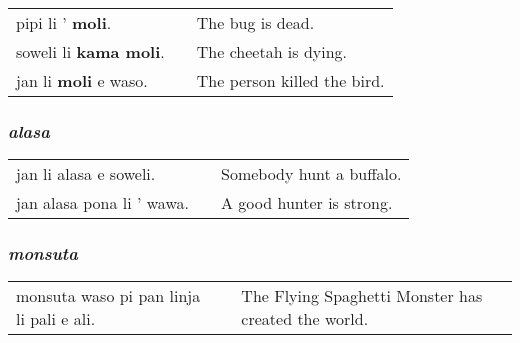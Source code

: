 \begin{supertabular}{p{5,5cm}|ll}
pipi li ' \textbf{moli}. && The bug is dead. \\
soweli li \textbf{kama moli}. && The cheetah is dying. \\
jan li \textbf{moli} e waso. && The person killed the bird. \\
\end{supertabular} 
%
\subsubsection*{\textit{alasa}}
\begin{supertabular}{p{5,5cm}|ll}
jan li alasa e soweli. && Somebody hunt a buffalo. \\
jan alasa pona li ' wawa. && A good hunter is strong. \\
\end{supertabular}

\subsubsection*{\textit{monsuta}}
\begin{supertabular}{p{5,5cm}|ll}
monsuta waso pi pan linja li pali e ali. &&  The Flying Spaghetti Monster has created the world. \\
\end{supertabular}

